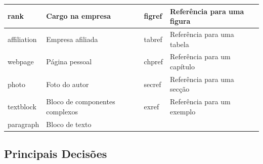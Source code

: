 \documentclass[a4paper]{article}
\begin{document}
\begin{center}
\begin{tabular}[c]{|l|l|l|l|}
\hline
\normalsize rank & \normalsize Cargo na empresa & \normalsize figref & \normalsize Referência para uma figura\\
\hline
\normalsize affiliation & \normalsize Empresa afiliada & \normalsize tabref & \normalsize Referência para uma tabela\\
\hline
\normalsize webpage & \normalsize Página pessoal & \normalsize chpref & \normalsize Referência para um capítulo\\
\hline   
\normalsize photo & \normalsize Foto do autor & \normalsize secref & \normalsize Referência para uma secção\\
\hline 
\normalsize textblock & \normalsize Bloco de componentes complexos & \normalsize exref & \normalsize Referência para um exemplo\\
\hline
\normalsize paragraph & \normalsize Bloco de texto & \normalsize  & \normalsize  \\
\hline   
\end{tabular}
\end{center}

\newpage

\subsection{\large Principais Decisões}
              
\end{document}
